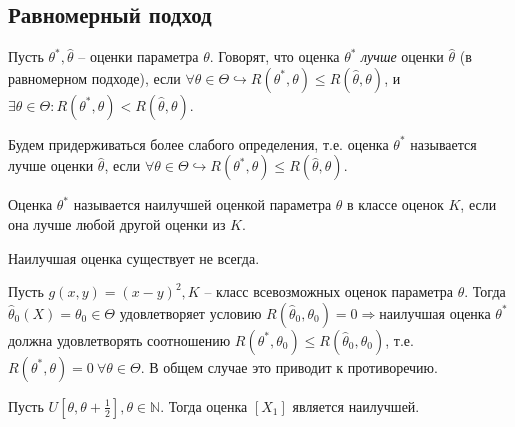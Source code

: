     \subsection{Равномерный подход}
    \begin{definition}
    Пусть $\displaystyle \theta ^{*} ,\hat{\theta }$ -- оценки параметра $\displaystyle \theta $. Говорят, что оценка $\displaystyle \theta ^{*}$ \textit{лучше} оценки $\displaystyle \hat{\theta }$ (в равномерном подходе), если $\displaystyle \forall \theta \in \Theta \hookrightarrow R\left( \theta ^{*} ,\theta \right) \leqslant R(\hat{\theta } ,\theta )$, и $\displaystyle \exists \theta \in \Theta :R\left( \theta ^{*} ,\theta \right) < R(\hat{\theta } ,\theta )$.
    \end{definition}
    \begin{note}
    Будем придерживаться более слабого определения, т.е. оценка $\displaystyle \theta ^{*}$ называется лучше оценки $\displaystyle \hat{\theta }$, если $\displaystyle \forall \theta \in \Theta \hookrightarrow R\left( \theta ^{*} ,\theta \right) \leqslant R(\hat{\theta } ,\theta )$.
    \end{note}
    \begin{definition}
    Оценка $\displaystyle \theta ^{*}$ называется наилучшей оценкой параметра $\displaystyle \theta $ в классе оценок $\displaystyle K$, если она лучше любой другой оценки из $\displaystyle K$.
    \end{definition}
    \begin{note}
    Наилучшая оценка существует не всегда.
    \end{note}
    \begin{example}
    Пусть $\displaystyle g( x,y) =( x-y)^{2} ,K$ -- класс всевозможных оценок параметра $\displaystyle \theta $. Тогда $\displaystyle \hat{\theta }_{0}( X) =\theta _{0} \in \Theta $ удовлетворяет условию $\displaystyle R(\hat{\theta }_{0} ,\theta _{0}) =0\Rightarrow $наилучшая оценка $\displaystyle \theta ^{*}$ должна удовлетворять соотношению $\displaystyle R\left( \theta ^{*} ,\theta _{0}\right) \leqslant R(\hat{\theta }_{0} ,\theta _{0})$, т.е. $\displaystyle R\left( \theta ^{*} ,\theta \right) =0\ \forall \theta \in \Theta $. В общем случае это приводит к противоречию.
    \end{example}
    \begin{example}
    Пусть $\displaystyle U\left[ \theta ,\theta +\frac{1}{2}\right] ,\theta \in \mathbb{N}$. Тогда оценка $\displaystyle [ X_{1}]$ является наилучшей.
    \end{example}
